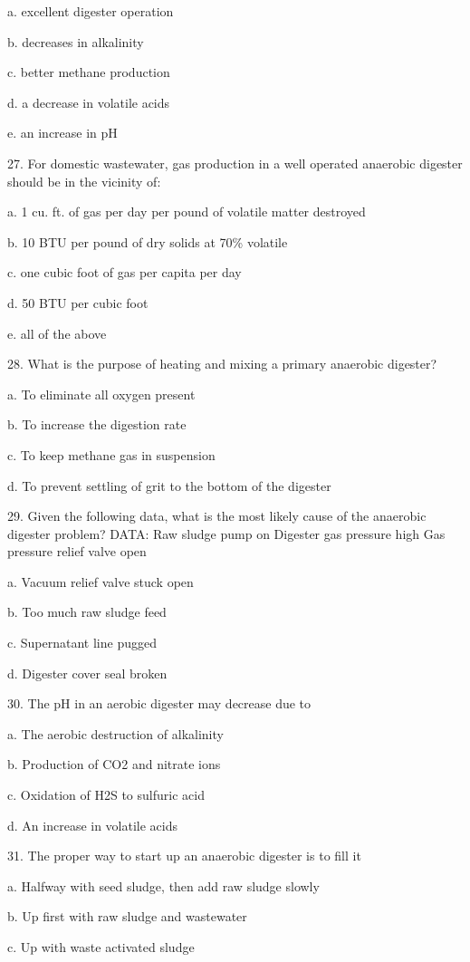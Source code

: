 \documentclass{article}
\begin{document}
a. excellent digester operation 

b. decreases in alkalinity 

c. better methane production 

d. a decrease in volatile acids 

e. an increase in pH 


27. For domestic wastewater, gas production in a well operated anaerobic digester should be in the vicinity of: 

a. 1 cu. ft. of gas per day per pound of volatile matter destroyed 

b. 10 BTU per pound of dry solids at 70\% volatile 

c. one cubic foot of gas per capita per day 

d. 50 BTU per cubic foot 

e. all of the above 


28. What is the purpose of heating and mixing a primary anaerobic digester? 

a. To eliminate all oxygen present 

b. To increase the digestion rate 

c. To keep methane gas in suspension 

d. To prevent settling of grit to the bottom of the digester 


29. Given the following data, what is the most likely cause of the anaerobic digester problem?
DATA: Raw sludge pump on
Digester gas pressure high
Gas pressure relief valve open 

a. Vacuum relief valve stuck open 

b. Too much raw sludge feed 

c. Supernatant line pugged 

d. Digester cover seal broken 


30. The pH in an aerobic digester may decrease due to 

a. The aerobic destruction of alkalinity 

b. Production of CO2 and nitrate ions 

c. Oxidation of H2S to sulfuric acid 

d. An increase in volatile acids 


31. The proper way to start up an anaerobic digester is to fill it 

a. Halfway with seed sludge, then add raw sludge slowly 

b. Up first with raw sludge and wastewater 

c. Up with waste activated sludge 
\end{document}
